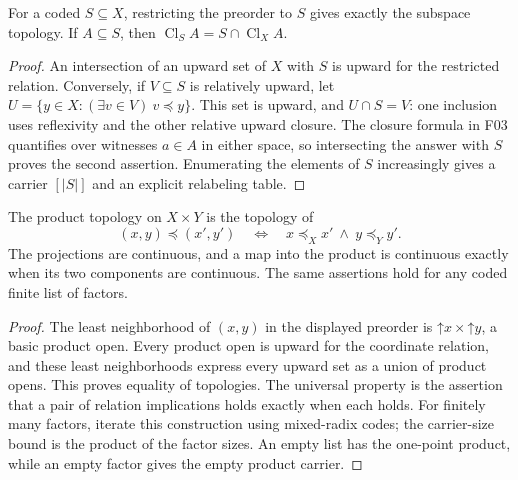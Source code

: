 \begin{theorem}[F09: subspaces]\label{thm:finite-subspace}
For a coded $S\subseteq X$, restricting the preorder to $S$ gives
exactly the subspace topology.  If $A\subseteq S$, then
$\operatorname{Cl}_S A=S\cap\operatorname{Cl}_X A$.
\end{theorem}
\begin{proof}
An intersection of an upward set of $X$ with $S$ is upward for the
restricted relation.  Conversely, if $V\subseteq S$ is relatively
upward, let $U=\{y\in X:(\exists v\in V)\ v\preceq y\}$.
This set is upward, and $U\cap S=V$: one inclusion uses
reflexivity and the other relative upward closure.  The closure
formula in F03 quantifies over witnesses $a\in A$ in either space,
so intersecting the answer with $S$ proves the second assertion.
Enumerating the elements of $S$ increasingly gives a carrier
$[|S|]$ and an explicit relabeling table.
\end{proof}

\begin{theorem}\label{thm:finite-products}
The product topology on $X\times Y$ is the topology of
\[
 (x,y)\preceq(x',y')\quad\Longleftrightarrow\quad
 x\preceq_X x'\ \land\ y\preceq_Y y'.
\]
The projections are continuous, and a map into the product is
continuous exactly when its two components are continuous.  The
same assertions hold for any coded finite list of factors.
\end{theorem}
\begin{proof}
The least neighborhood of $(x,y)$ in the displayed preorder is
$\mathord\uparrow x\times\mathord\uparrow y$, a basic product
open.  Every product open is upward for the coordinate relation,
and these least neighborhoods express every upward set as a union
of product opens.  This proves equality of topologies.  The
universal property is the assertion that a pair of relation
implications holds exactly when each holds.  For finitely many
factors, iterate this construction using mixed-radix codes; the
carrier-size bound is the product of the factor sizes.  An empty
list has the one-point product, while an empty factor gives the
empty product carrier.
\end{proof}

